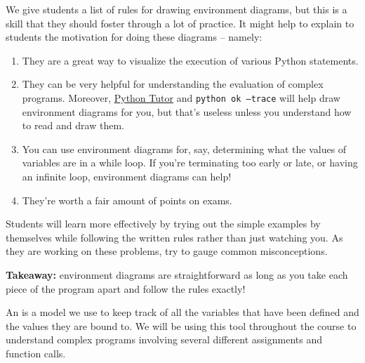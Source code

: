 \begin{guide}
  We give students a list of rules for drawing environment diagrams, but this is a skill that they should foster through a lot of practice. It might help to explain to students the motivation for doing these diagrams -- namely:

\begin{enumerate}
  \item They are a great way to visualize the execution of various Python statements.
  \item They can be very helpful for understanding the evaluation of complex programs. Moreover, \href{tutor.cs61a.org}{Python Tutor} and \texttt{python ok --trace} will help draw environment diagrams for you, but that's useless unless you understand how to read and draw them.
  \item You can use environment diagrams for, say, determining what the values of variables are in a while loop. If you’re terminating too early or late, or having an infinite loop, environment diagrams can help!
  \item They're worth a fair amount of points on exams.
\end{enumerate}

Students will learn more effectively by trying out the simple examples by themselves while following the written rules rather than just watching you. As they are working on these problems, try to gauge common misconceptions.

\textbf{Takeaway:} environment diagrams are straightforward as long as you take each piece of the program apart and follow the rules exactly!

\end{guide}

An  is a model we use to keep track of all the variables that have been
defined and the values they are bound to. We will be using this tool throughout
the course to understand complex programs involving several different assignments
and function calls.